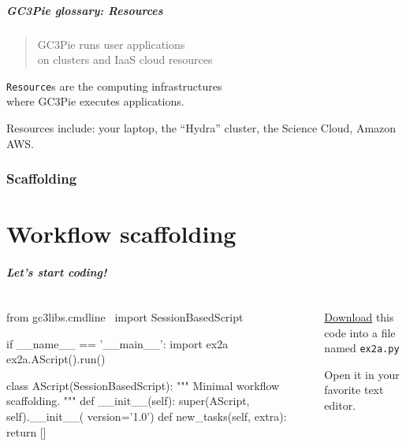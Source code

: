 \documentclass[english,serif,mathserif,xcolor=pdftex,dvipsnames,table]{beamer}
\begin{document}
\begin{frame}
  \frametitle{GC3Pie glossary: Resources}
  \begin{quote}
    GC3Pie runs user applications
    \\
    on clusters and IaaS cloud \alert{resources}
  \end{quote}

  \+ \alert{\texttt{Resource}s are the computing infrastructures \\ where GC3Pie executes applications.}

  \+ Resources include: your laptop, the ``Hydra'' cluster, the Science Cloud, Amazon AWS.
\end{frame}


\section{Scaffolding}
\part{Workflow scaffolding}

\begin{frame}[fragile]
  \frametitle{Let's start coding!}
  \begin{columns}
    \begin{column}{0.7\linewidth}
\begin{python}
from gc3libs.cmdline \
  import SessionBasedScript

if __name__ == '__main__':
  import ex2a
  ex2a.AScript().run()

class AScript(SessionBasedScript):
  """
  Minimal workflow scaffolding.
  """
  def __init__(self):
    super(AScript, self).__init__(
        version='1.0')
  def new_tasks(self, extra):
    return []
\end{python}
    \end{column}
    \begin{column}{0.3\linewidth}
      \href{https://raw.githubusercontent.com/uzh/gc3pie/training-july-2016/docs/programmers/tutorials/workflows/solutions/ex2a.py}{Download} this code into a file named \texttt{ex2a.py}

      \+
      Open it in your favorite text editor.
    \end{column}
  \end{columns}
\end{frame}
\end{document}
